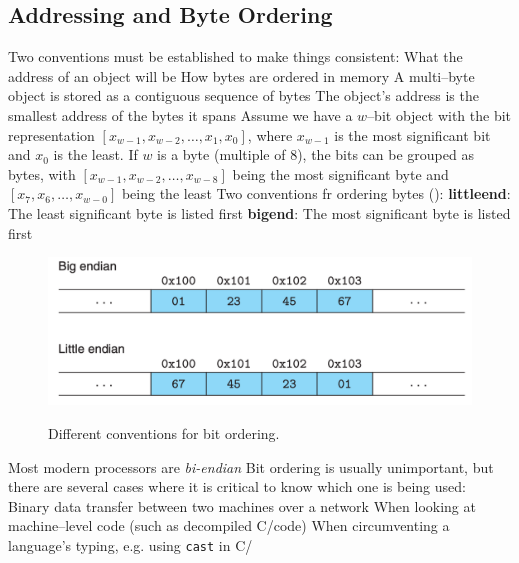 \documentclass[../bryant_comp_sys.tex]{subfiles}
\begin{document}
            \subsection{Addressing and Byte Ordering}
                \begin{outline}
                    \1 Two conventions must be established to make things consistent:
                        \2 What the address of an object will be
                        \2 How bytes are ordered in memory
                    \1 A multi--byte object is stored as a contiguous sequence of bytes
                        \2 The object's address is the smallest address of the bytes it spans
                    \1 Assume we have a \(w\)--bit object with the bit representation \(\left[ x_{w-1}, x_{w-2}, \ldots, x_1, x_0 \right]\), where \(x_{w-1}\) is the most significant bit and \(x_0\) is the least.
                        \2 If \(w\) is a byte (multiple of 8), the bits can be grouped as bytes, with \(\left[ x_{w-1}, x_{w-2}, \ldots, x_{w-8} \right]\) being the most significant byte and  \(\left[ x_{7}, x_{6}, \ldots, x_{w-0} \right]\) being the least
                        \2 Two conventions fr ordering bytes ():
                            \3 \textbf{\Gls{littleend}}: The least significant byte is listed first
                            \3 \textbf{\Gls{bigend}}: The most significant byte is listed first
                            
                    \begin{figure}
                        \centering
                        \includegraphics[width=0.5\linewidth]{ch2/figs/endian.png}
                        \label{fig:endian}
                        \caption{Different conventions for bit ordering.}
                    \end{figure}

                        \2 Most modern processors are \textit{bi-endian}
                        \2 Bit ordering is usually unimportant, but there are several cases where it is critical to know which one is being used:
                            \3 Binary data transfer between two machines over a network
                            \3 When looking at machine--level code (such as decompiled C/\Cpp code)
                            \3 When circumventing a language's typing, e.g. using \texttt{cast} in C/\Cpp
                \end{outline}
            
\end{document}
